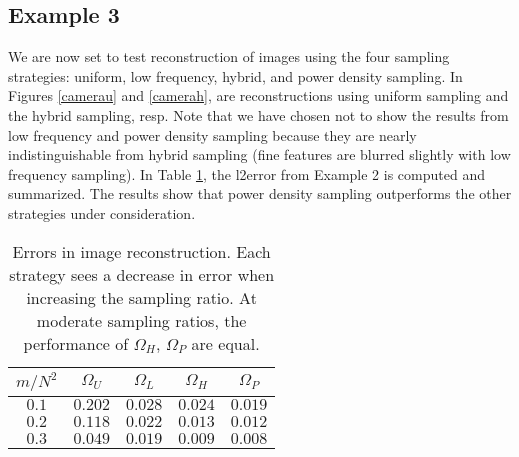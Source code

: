 \documentclass[11pt, oneside]{article}   %
\begin{document}
\subsection{Example 3}
We are now set to test reconstruction of images using the four sampling strategies: uniform, low frequency, hybrid, and power density sampling. In Figures \ref{camerau} and \ref{camerah}, are reconstructions using uniform sampling and the hybrid sampling, resp. Note that we have chosen not to show the results from low frequency and power density sampling because they are nearly indistinguishable from hybrid sampling (fine features are blurred slightly with low frequency sampling). In Table \ref{2d ex1}, the l2error from Example 2 is computed and summarized. The results show that power density sampling outperforms the other strategies under consideration.
\begin{table}[htb!]
        \centering
\begin{tabular}{c|cccc}
$m/N^2$ & $\Omega_U$ & $\Omega_L$ & $\Omega_H$ & $\Omega_P$ \\ \hline
$0.1$ & $0.202$ & $0.028$ & $0.024$ & $0.019$ \\
$0.2$ & $0.118$ & $0.022$ & $0.013$ & $0.012$\\
$0.3$ & $0.049$     & $0.019$ & $ 0.009$ & $0.008$
\end{tabular}
\caption{Errors in image reconstruction. Each strategy sees a decrease in error when increasing the sampling ratio.  At moderate sampling ratios, the performance of $\Omega_H$, $\Omega_P$ are equal.}
\label{2d ex1}
\end{table}
\end{document}
